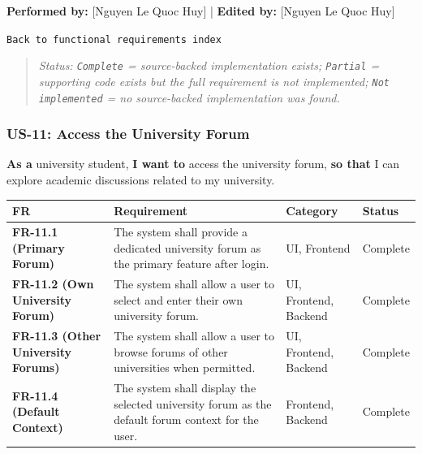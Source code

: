 \documentclass[12pt]{article}
\renewcommand{\baselinestretch}{1.5}
\begin{document}
\textbf{Performed by:} [Nguyen Le Quoc Huy] | \textbf{Edited by:} [Nguyen Le Quoc Huy]
\par\medskip

\texttt{Back to functional requirements index}
\par\medskip

\begin{quote}
\textit{Status: \texttt{Complete} = source-backed implementation exists; \texttt{Partial} = supporting code exists but the full requirement is not implemented; \texttt{Not implemented} = no source-backed implementation was found.}
\end{quote}
\par\medskip

\hypertarget{sec:us-11-access-the-university-forum}{}
\subsubsection*{US-11: Access the University Forum}
\par\medskip

\textbf{As a} university student, \textbf{I want to} access the university forum, \textbf{so that} I can explore academic discussions related to my university.
\par\medskip

\begingroup
\small
\renewcommand{\baselinestretch}{1.0}\selectfont
\renewcommand{\arraystretch}{1.15}
\setlength{\tabcolsep}{6pt}
\begin{longtable}{|>{\raggedright\arraybackslash}p{}|>{\raggedright\arraybackslash}p{}|>{\raggedright\arraybackslash}p{}|>{\raggedright\arraybackslash}p{}|}
\hline
\textbf{FR} & \textbf{Requirement} & \textbf{Category} & \textbf{Status} \\ \hline
\endhead
\textbf{FR-11.1 (Primary Forum)} & The system shall provide a dedicated university forum as the primary feature after login. & UI, Frontend & Complete \\ \hline
\textbf{FR-11.2 (Own University Forum)} & The system shall allow a user to select and enter their own university forum. & UI, Frontend, Backend & Complete \\ \hline
\textbf{FR-11.3 (Other University Forums)} & The system shall allow a user to browse forums of other universities when permitted. & UI, Frontend, Backend & Complete \\ \hline
\textbf{FR-11.4 (Default Context)} & The system shall display the selected university forum as the default forum context for the user. & Frontend, Backend & Complete \\ \hline
\end{longtable}
\endgroup
\par\medskip
\end{document}
